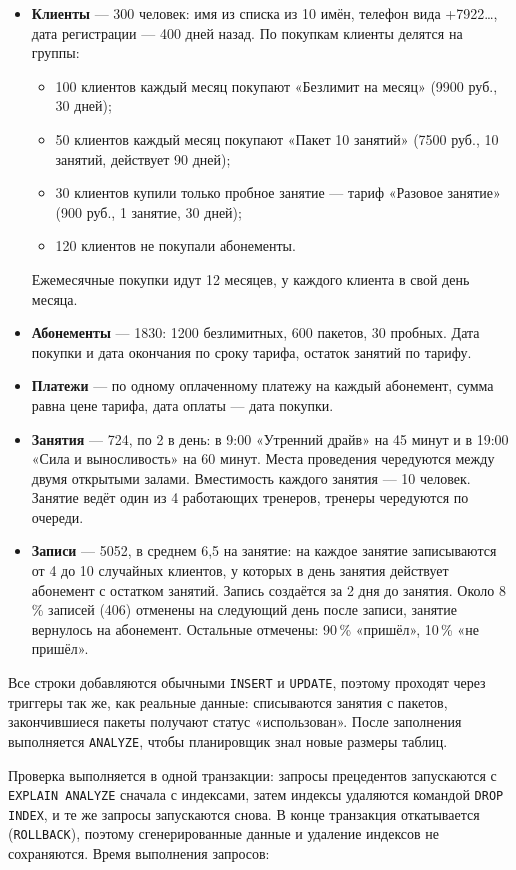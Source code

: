 \documentclass[14pt,a4paper]{extarticle}
\renewcommand{\_}{\textunderscore\allowbreak}
\begin{document}
\begin{itemize}
  \item \textbf{Клиенты} --- 300 человек: имя из списка из 10 имён, телефон вида +7922\ldots, дата регистрации --- 400 дней назад. По покупкам клиенты делятся на группы:
  \begin{itemize}
    \item 100 клиентов каждый месяц покупают «Безлимит на месяц» (9900 руб., 30 дней);
    \item 50 клиентов каждый месяц покупают «Пакет 10 занятий» (7500 руб., 10 занятий, действует 90 дней);
    \item 30 клиентов купили только пробное занятие --- тариф «Разовое занятие» (900 руб., 1 занятие, 30 дней);
    \item 120 клиентов не покупали абонементы.
  \end{itemize}
  Ежемесячные покупки идут 12 месяцев, у каждого клиента в свой день месяца.
  \item \textbf{Абонементы} --- 1830: 1200 безлимитных, 600 пакетов, 30 пробных. Дата покупки и дата окончания по сроку тарифа, остаток занятий по тарифу.
  \item \textbf{Платежи} --- по одному оплаченному платежу на каждый абонемент, сумма равна цене тарифа, дата оплаты --- дата покупки.
  \item \textbf{Занятия} --- 724, по 2 в день: в 9:00 «Утренний драйв» на 45 минут и в 19:00 «Сила и выносливость» на 60 минут. Места проведения чередуются между двумя открытыми залами. Вместимость каждого занятия --- 10 человек. Занятие ведёт один из 4 работающих тренеров, тренеры чередуются по очереди.
  \item \textbf{Записи} --- 5052, в среднем 6,5 на занятие: на каждое занятие записываются от 4 до 10 случайных клиентов, у которых в день занятия действует абонемент с остатком занятий. Запись создаётся за 2 дня до занятия. Около 8\,\% записей (406) отменены на следующий день после записи, занятие вернулось на абонемент. Остальные отмечены: 90\,\% «пришёл», 10\,\% «не пришёл».
\end{itemize}

Все строки добавляются обычными \texttt{INSERT} и \texttt{UPDATE}, поэтому проходят через триггеры так же, как реальные данные: списываются занятия с пакетов, закончившиеся пакеты получают статус «использован». После заполнения выполняется \texttt{ANALYZE}, чтобы планировщик знал новые размеры таблиц.

Проверка выполняется в одной транзакции: запросы прецедентов запускаются с \texttt{EXPLAIN ANALYZE} сначала с индексами, затем индексы удаляются командой \texttt{DROP INDEX}, и те же запросы запускаются снова. В конце транзакция откатывается (\texttt{ROLLBACK}), поэтому сгенерированные данные и удаление индексов не сохраняются. Время выполнения запросов:
\end{document}
